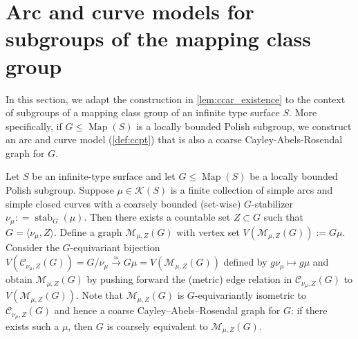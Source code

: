 \documentclass[twoside]{amsart}
\theoremstyle{plain}
\newtheorem{lemma}[theorem]{Lemma}
\theoremstyle{break}
\theoremstyle{definition}
\theoremstyle{remark}
\newcommand{\dfn}{\mathrel{\mathop:}=}
\DeclareMathOperator{\Map}{Map}
\DeclareMathOperator{\stab}{stab}
\newcommand{\cc}{\mathcal C}
\begin{document}




\section{Arc and curve models for subgroups of the mapping class
group }\label{sec:model_general}

In this section, we adapt the construction in \cref{lem:ccar_existence} 
to the context of subgroups of a mapping class group of an infinite type surface $S$. 
More specifically, if 
$G\leq\Map(S)$ is a locally bounded Polish subgroup, we 
construct an arc and curve model (\cref{def:ccpt}) that 
is also a coarse Cayley-Abels-Rosendal graph for $G$.

Let $S$ be an infinite-type surface 
and let $G\leq \Map(S)$ be a locally bounded Polish subgroup.
Suppose $\mu\in\mathcal{K}(S)$ is a finite collection of simple arcs and simple closed 
curves with a coarsely bounded (set-wise) 
$G$-stabilizer $\nu_\mu \dfn \stab_G(\mu)$. Then there exists a countable set
$Z\subset G$ such that $G=\langle\nu_\mu, Z\rangle$.
Define a graph $\mathcal{M}_{\mu,Z}(G)$ with vertex 
set $V(\mathcal{M}_{{\mu,Z}}(G)):=G\mu$. Consider the $G$-equivariant bijection 
$V(\mathcal{C}_{\nu_\mu,Z}(G))=
G/\nu_\mu \xrightarrow{\simeq}G\mu=V(\mathcal{M}_{\mu,Z}(G))$
defined by $g\nu_\mu\mapsto g\mu$ and obtain $\mathcal{M}_{\mu,Z}(G)$ by
pushing 
forward the (metric) edge relation in $\cc_{\nu_\mu,Z}(G)$ to
$V(\mathcal{M}_{\mu,Z}(G))$. Note that $\mathcal{M}_{\mu,Z}(G)$ is 
$G$-equivariantly isometric to $\cc_{\nu_\mu,Z}(G)$ and hence a 
coarse Cayley--Abels--Rosendal graph for $G$: if there exists such a $\mu$, then 
$G$ is coarsely equivalent to $\mathcal{M}_{\mu,Z}(G)$. 
\end{document}
